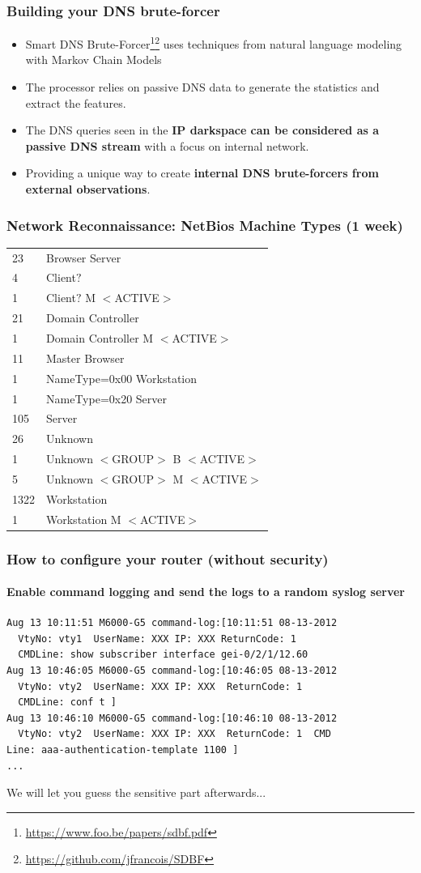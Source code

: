 \documentclass{beamer}
\begin{document}
\begin{frame}
        \frametitle{Building your DNS brute-forcer}
\begin{itemize}
        \item Smart DNS Brute-Forcer\footnote{\url{https://www.foo.be/papers/sdbf.pdf}}\footnote{\url{https://github.com/jfrancois/SDBF}} uses techniques from natural language modeling with Markov Chain Models
\item The processor relies on passive DNS data to generate the statistics and extract the features.
\item The DNS queries seen in the {\bf IP darkspace can be considered as a passive DNS stream} with a focus on internal network.
\item Providing a unique way to create {\bf internal DNS brute-forcers from external observations}.
\end{itemize}
\end{frame}

\begin{frame}
\frametitle{Network Reconnaissance: NetBios Machine Types (1 week)}
\begin{tabular}{ll}
     23 &Browser Server\\
      4 &Client$?$\\
      1 &Client$?$ M $<$ACTIVE$>$ \\
     21 &Domain Controller\\
      1 &Domain Controller M $<$ACTIVE$>$ \\
     11 &Master Browser\\
      1 &NameType=0x00 Workstation\\
      1 &NameType=0x20 Server\\
    105 &Server\\
     26 &Unknown\\
      1 &Unknown $<$GROUP$>$ B $<$ACTIVE$>$\\
      5 &Unknown $<$GROUP$>$ M $<$ACTIVE$>$\\
   1322 &Workstation\\
      1 &Workstation M $<$ACTIVE$>$ \\
\end{tabular}
\end{frame}


\begin{frame}[fragile]
\frametitle{How to configure your router (without security)}
\framesubtitle{Enable command logging and send the logs to a random syslog server}
\begin{verbatim}
Aug 13 10:11:51 M6000-G5 command-log:[10:11:51 08-13-2012
  VtyNo: vty1  UserName: XXX IP: XXX ReturnCode: 1
  CMDLine: show subscriber interface gei-0/2/1/12.60
Aug 13 10:46:05 M6000-G5 command-log:[10:46:05 08-13-2012
  VtyNo: vty2  UserName: XXX IP: XXX  ReturnCode: 1
  CMDLine: conf t ]
Aug 13 10:46:10 M6000-G5 command-log:[10:46:10 08-13-2012
  VtyNo: vty2  UserName: XXX IP: XXX  ReturnCode: 1  CMD
Line: aaa-authentication-template 1100 ]
...
\end{verbatim}
We will let you guess the sensitive part afterwards...
\end{frame}
\end{document}
